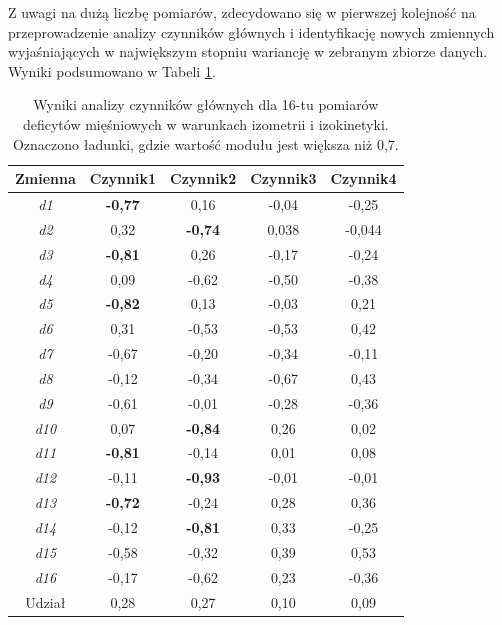 Z uwagi na dużą liczbę pomiarów, zdecydowano się w pierwszej kolejność \linebreak na przeprowadzenie analizy czynników głównych i identyfikację nowych zmiennych wyjaśniających w największym stopniu wariancję w zebranym zbiorze danych. Wyniki podsumowano w Tabeli \ref{tab:pca-muscles}.

\begin{table}[h]
	\centering
	\setlength{\tabcolsep}{3pt}
	\setlength\extrarowheight{2pt}
	\caption{Wyniki analizy czynników głównych dla 16-tu pomiarów deficytów mięśniowych w warunkach izometrii i izokinetyki. Oznaczono ładunki, gdzie wartość modułu jest większa niż 0,7.}
	\label{tab:pca-muscles}
	\begin{tabular}{c|c|c|c|c}

		Zmienna&Czynnik1&Czynnik2&Czynnik3&Czynnik4 \\
		\hline \hline
		\textit{d1}&\textbf{-0,77}&0,16&-0,04&-0,25 \\
		\hline
		\textit{d2}&0,32&\textbf{-0,74}&0,038&-0,044 \\
		\hline
		\textit{d3}&\textbf{-0,81}&0,26&-0,17&-0,24 \\
		\hline
		\textit{d4}&0,09&-0,62&-0,50&-0,38 \\
		\hline
		\textit{d5}&\textbf{-0,82}&0,13&-0,03&0,21 \\
		\hline
		\textit{d6}&0,31&-0,53&-0,53&0,42 \\
		\hline
		\textit{d7}&-0,67&-0,20&-0,34&-0,11 \\
		\hline
		\textit{d8}&-0,12&-0,34&-0,67&0,43 \\
		\hline
		\textit{d9}&-0,61&-0,01&-0,28&-0,36 \\
		\hline
		\textit{d10}&0,07&\textbf{-0,84}&0,26&0,02 \\
		\hline
		\textit{d11}&\textbf{-0,81}&-0,14&0,01&0,08 \\
		\hline
		\textit{d12}&-0,11&\textbf{-0,93}&-0,01&-0,01 \\
		\hline
		\textit{d13}&\textbf{-0,72}&-0,24&0,28&0,36 \\
		\hline
		\textit{d14}&-0,12&\textbf{-0,81}&0,33&-0,25 \\
		\hline
		\textit{d15}&-0,58&-0,32&0,39&0,53 \\
		\hline
		\textit{d16}&-0,17&-0,62&0,23&-0,36 \\
		\hline\hline
		Udział&0,28&0,27&0,10&0,09 \\

	\end{tabular}
\end{table}

